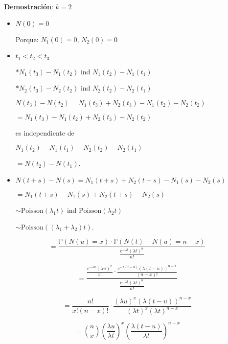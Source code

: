 \documentclass[12pt,a4paper]{article}
\begin{document}
\textbf{Demostración}: $k = 2$

\begin{itemize}
    \item $N(0) = 0$
    
    Porque: $N_1(0) = 0$, $N_2(0) = 0$
    
    \item $t_1 < t_2 < t_3$
    
    $* N_1(t_3) - N_1(t_2)$ ind $N_1(t_2) - N_1(t_1)$
    
    $* N_2(t_3) - N_2(t_2)$ ind $N_2(t_2) - N_2(t_1)$
    
    $N(t_3) - N(t_2) = N_1(t_3) + N_2(t_3) - N_1(t_2) - N_2(t_2)$
    
    $= N_1(t_3) - N_1(t_2) + N_2(t_3) - N_2(t_2)$
    
    es independiente de
    
    $N_1(t_2) - N_1(t_1) + N_2(t_2) - N_2(t_1)$
    
    $= N(t_2) - N(t_1)$.
    
    \item $N(t+s) - N(s) = N_1(t+s) + N_2(t+s) - N_1(s) - N_2(s)$
    
    $= N_1(t+s) - N_1(s) + N_2(t+s) - N_2(s)$
    
    $\sim \text{Poisson}(\lambda_1 t)$ ind $\text{Poisson}(\lambda_2 t)$
    
    $\sim \text{Poisson}((\lambda_1 + \lambda_2)t)$.
\end{itemize}

\begin{equation*}
= \frac{\mathbb{P}(N(u) = x) \cdot \mathbb{P}(N(t) - N(u) = n - x)}{\frac{e^{-\lambda t} (\lambda t)^n}{n!}}
\end{equation*}

\begin{equation*}
= \frac{\frac{e^{-\lambda u} (\lambda u)^x}{x!} \cdot \frac{e^{-\lambda(t-u)} (\lambda(t-u))^{n-x}}{(n-x)!}}{\frac{e^{-\lambda t} (\lambda t)^n}{n!}}
\end{equation*}

\begin{equation*}
= \frac{n!}{x!(n-x)!} \cdot \frac{(\lambda u)^x (\lambda(t-u))^{n-x}}{(\lambda t)^x (\lambda t)^{n-x}}
\end{equation*}

\begin{equation*}
= \binom{n}{x} \left(\frac{\lambda u}{\lambda t}\right)^x \left(\frac{\lambda(t-u)}{\lambda t}\right)^{n-x}
\end{equation*}
\end{document}
